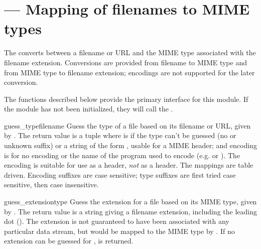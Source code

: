 
\section{ ---
         Mapping of filenames to MIME types}




The  converts between a filename or URL and the MIME
type associated with the filename extension.  Conversions are provided 
from filename to MIME type and from MIME type to filename extension;
encodings are not supported for the later conversion.

The functions described below provide the primary interface for this
module.  If the module has not been initialized, they will call the
.


\begin{funcdesc}{guess_type}{filename}
Guess the type of a file based on its filename or URL, given by
.
The return value is a tuple  where
 is  if the type can't be guessed (no or unknown
suffix) or a string of the form ,
usable for a MIME  header; and 
encoding is  for no encoding or the name of the program used
to encode (e.g.  or ).  The encoding
is suitable for use as a  header,
\emph{not} as a  header.  The mappings
are table driven.  Encoding suffixes are case sensitive; type suffixes
are first tried case sensitive, then case insensitive.
\end{funcdesc}

\begin{funcdesc}{guess_extension}{type}
Guess the extension for a file based on its MIME type, given by
.
The return value is a string giving a filename extension, including the
leading dot ().  The extension is not guaranteed to have been
associated with any particular data stream, but would be mapped to the 
MIME type  by .  If no extension can
be guessed for ,  is returned.
\end{funcdesc}


